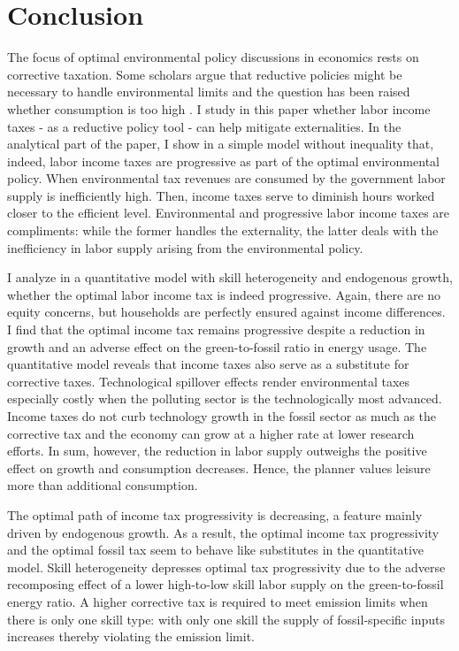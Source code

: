 \section{Conclusion}\label{sec:con}
The focus of optimal environmental policy discussions in economics rests on corrective taxation. Some scholars argue that  reductive policies might be necessary to handle environmental limits \cite{Schor2005SustainableReduction} and the question has been raised whether consumption is too high \citep{Arrow2004AreMuch, Dasgupta2021}.
I study in this paper whether labor income taxes - as a reductive policy tool - can help mitigate externalities. 
In the analytical part of the paper, I show in a simple model without inequality that, indeed, labor income taxes are  progressive as part of the optimal environmental policy. 
When environmental tax revenues are consumed by the government labor supply is inefficiently high. Then, income taxes serve to diminish hours worked closer to the efficient level. Environmental and progressive labor income taxes are compliments: while the former handles the externality, the latter deals with the inefficiency in labor supply arising from the environmental policy.  


I analyze in a quantitative model with skill heterogeneity and endogenous growth, whether the optimal labor income tax is indeed progressive. Again, there are no equity concerns, but households are perfectly ensured against income differences. 
I find that the optimal income tax remains progressive despite a reduction in growth and an adverse effect on the green-to-fossil ratio in energy usage. 
The quantitative model reveals that income taxes also serve as a substitute for corrective taxes. Technological spillover effects render environmental taxes especially costly when the polluting sector is the technologically most advanced. Income taxes do not curb technology growth in the fossil sector as much as the corrective tax and the economy can grow at a higher rate at lower research efforts. In sum, however, the reduction in labor supply outweighs the positive effect on growth and consumption decreases. Hence, the planner values leisure more than additional consumption. 

The optimal path of income tax progressivity is decreasing, a feature mainly driven by endogenous growth. As a result, the optimal income tax progressivity and the optimal fossil tax seem to behave like substitutes in the quantitative model. 
Skill heterogeneity depresses optimal tax progressivity due to the adverse recomposing effect of a lower high-to-low skill labor supply on the green-to-fossil energy ratio. A higher corrective tax is required to meet emission limits when there is only one skill type: with only one skill the supply of fossil-specific inputs increases thereby violating the emission limit.

